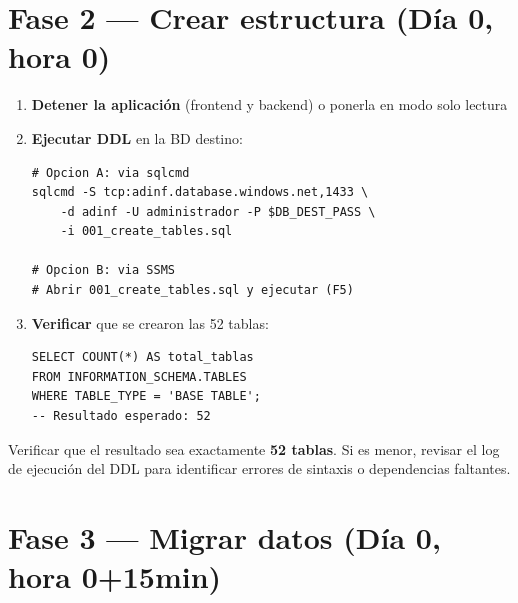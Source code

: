 \documentclass[12pt,a4paper,twoside]{report}
\begin{document}
\section{Fase 2 --- Crear estructura (D\'ia 0, hora 0)}

\begin{enumerate}
    \item \textbf{Detener la aplicaci\'on} (frontend y backend) o ponerla en modo solo lectura
    \item \textbf{Ejecutar DDL} en la BD destino:
\begin{lstlisting}[style=bashstyle]
# Opcion A: via sqlcmd
sqlcmd -S tcp:adinf.database.windows.net,1433 \
    -d adinf -U administrador -P $DB_DEST_PASS \
    -i 001_create_tables.sql

# Opcion B: via SSMS
# Abrir 001_create_tables.sql y ejecutar (F5)
\end{lstlisting}
    \item \textbf{Verificar} que se crearon las 52 tablas:
\begin{lstlisting}[style=sqlstyle]
SELECT COUNT(*) AS total_tablas
FROM INFORMATION_SCHEMA.TABLES
WHERE TABLE_TYPE = 'BASE TABLE';
-- Resultado esperado: 52
\end{lstlisting}
\end{enumerate}

\begin{successbox}
Verificar que el resultado sea exactamente \textbf{52 tablas}. Si es menor, revisar el log de ejecuci\'on del DDL para identificar errores de sintaxis o dependencias faltantes.
\end{successbox}

\section{Fase 3 --- Migrar datos (D\'ia 0, hora 0+15min)}
\end{document}

